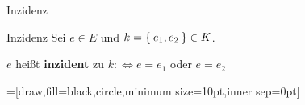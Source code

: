 \begin{frame}{Inzidenz}
\begin{block}{Inzidenz}
Sei $e \in E$ und $k = \Set{e_1, e_2} \in K$.

$e$ heißt \textbf{inzident} zu $k :\Leftrightarrow e = e_1$ oder $e = e_2$
\end{block}

\pause
{}=[draw,fill=black,circle,minimum size=10pt,inner sep=0pt]

\begin{gallery}
    \\
\end{gallery}
\end{frame}
